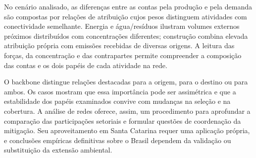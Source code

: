 \documentclass[12pt]{article}
\begin{document}
No cenário analisado, as diferenças entre as contas pela produção e pela demanda são compostas por relações de atribuição cujos pesos distinguem atividades com conectividade semelhante. Energia e água/resíduos ilustram volumes externos próximos distribuídos com concentrações diferentes; construção combina elevada atribuição própria com emissões recebidas de diversas origens. A leitura das forças, da concentração e das contrapartes permite compreender a composição das contas e os dois papéis de cada atividade na rede.

O backbone distingue relações destacadas para a origem, para o destino ou para ambos. Os casos mostram que essa importância pode ser assimétrica e que a estabilidade dos papéis examinados convive com mudanças na seleção e na cobertura. A análise de redes oferece, assim, um procedimento para aprofundar a comparação das participações setoriais e formular questões de coordenação da mitigação. Seu aproveitamento em Santa Catarina requer uma aplicação própria, e conclusões empíricas definitivas sobre o Brasil dependem da validação ou substituição da extensão ambiental.

\clearpage
{\renewcommand*{\bibfont}{\small}
\printbibliography[title={Referências}]
}

\end{document}
